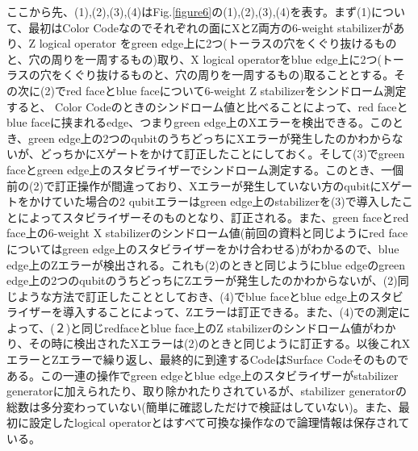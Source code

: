 \documentclass[a4paper,10pt]{ltjsarticle}
\begin{document}
{    ここから先、(1),(2),(3),(4)はFig.\ref{figure6}の(1),(2),(3),(4)を表す。まず(1)について、最初はColor Codeなのでそれぞれの面にXとZ両方の6-weight stabilizerがあり、Z logical operator をgreen edge上に2つ(トーラスの穴をくぐり抜けるものと、穴の周りを一周するもの)取り、X logical operatorをblue edge上に2つ(トーラスの穴をくぐり抜けるものと、穴の周りを一周するもの)取ることとする。その次に(2)でred faceとblue faceについて6-weight Z stabilizerをシンドローム測定すると、 Color Codeのときのシンドローム値と比べることによって、red faceとblue faceに挟まれるedge、つまりgreen edge上のXエラーを検出できる。このとき、green edge上の2つのqubitのうちどっちにXエラーが発生したのかわからないが、どっちかにXゲートをかけて訂正したことにしておく。そして(3)でgreen faceとgreen edge上のスタビライザーでシンドローム測定する。このとき、一個前の(2)で訂正操作が間違っており、Xエラーが発生していない方のqubitにXゲートをかけていた場合の2 qubitエラーはgreen edge上のstabilizerを(3)で導入したことによってスタビライザーそのものとなり、訂正される。また、green faceとred face上の6-weight X stabilizerのシンドローム値(前回の資料と同じようにred faceについてはgreen edge上のスタビライザーをかけ合わせる)がわかるので、blue edge上のZエラーが検出される。これも(2)のときと同じようにblue edgeのgreen edge上の2つのqubitのうちどっちにZエラーが発生したのかわからないが、(2)同じような方法で訂正したこととしておき、(4)でblue faceとblue edge上のスタビライザーを導入することによって、Zエラーは訂正できる。また、(4)での測定によって、(２)と同じredfaceとblue face上のZ stabilizerのシンドローム値がわかり、その時に検出されたXエラーは(2)のときと同じように訂正する。以後これXエラーとZエラーで繰り返し、最終的に到達するCodeはSurface Codeそのものである。この一連の操作でgreen edgeとblue edge上のスタビライザーがstabilizer generatorに加えられたり、取り除かれたりされているが、stabilizer generatorの総数は多分変わっていない(簡単に確認しただけで検証はしていない)。また、最初に設定したlogical operatorとはすべて可換な操作なので論理情報は保存されている。
}
\end{document}
